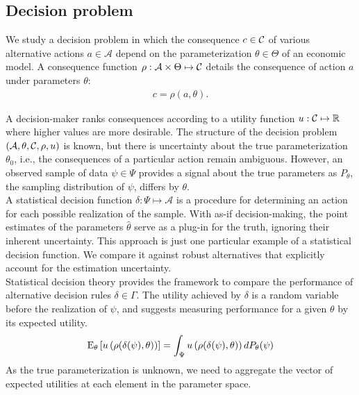 \subsection{Decision problem}
We study a decision problem in which the consequence $c \in \mathcal{C}$ of various alternative actions $a\in\mathcal{A}$ depend on the parameterization $\theta\in \Theta$ of an economic model. A consequence function $\rho: \mathcal{A} \times \Theta \mapsto \mathcal{C}$  details the consequence of action $a$ under parameters $\theta$:
%
\begin{align*}
c = \rho(a, \theta).
\end{align*}

A decision-maker ranks consequences according to a utility function $u: \mathcal{C} \mapsto \mathbb{R}$ where higher values are more desirable. The structure of the decision problem $(\mathcal{A}, \theta, \mathcal{C}, \rho, u)$ is known, but there is uncertainty about the true parameterization $\theta_0$, i.e., the consequences of a particular action remain ambiguous. However, an observed sample of data $\psi \in \Psi$ provides a signal about the true parameters as $P_{\theta}$, the sampling distribution of $\psi$, differs by $\theta$.\\

A statistical decision function $\delta: \Psi \mapsto \mathcal{A}$ is a procedure for determining an action for each possible realization of the sample. With as-if decision-making, the point estimates of the parameters $\hat{\theta}$ serve as a plug-in for the truth, ignoring their inherent uncertainty. This approach is just one particular example of a statistical decision function. We compare it against robust alternatives that explicitly account for the estimation uncertainty.\\

Statistical decision theory provides the framework to compare the performance of alternative decision rules  $\delta \in \Gamma$. The utility achieved by $\delta$ is a random variable before the realization of $\psi$, and \citet{Wald.1950} suggests measuring performance for a given $\theta$ by its expected utility.
%
\begin{align*}
  \mathrm{E}_{\theta}\left[u\left(\rho(\delta(\psi), \theta)\right)\right] = \int_\Psi u\left(\rho(\delta(\psi), \theta)\right) d P_{\theta}(\psi)
\end{align*}
%
As the true parameterization is unknown, we need to aggregate the vector of expected utilities at each element in the parameter space.\\

